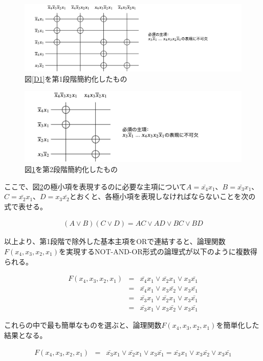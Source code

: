 \documentclass[10pt,dvipdfmx]{jsarticle}
\begin{document}
\begin{figure}
\begin{center}
\includegraphics[width=15cm]{D2.jpg}
\end{center}
\caption{図\ref{D1}を第1段階簡約化したもの}
\label{D2}
\end{figure}

\begin{figure}
\begin{center}
\includegraphics[width=12cm]{D3.jpg}
\end{center}
\caption{図\ref{D2}を第2段階簡約化したもの}
\label{D3}
\end{figure}

ここで、図\ref{D3}の極小項を表現するのに必要な主項について$A=\bar{x_4}x_1$、$B=\bar{x_3}x_1$、$C=\bar{x_2}x_1$、$D=x_3\bar{x_2}$とおくと、各極小項を表現しなければならないことを次の式で表せる。

\begin{eqnarray*}
(A \lor B)(C \lor D) = AC \lor AD \lor BC \lor BD
\end{eqnarray*}

以上より、第1段階で除外した基本主項をORで連結すると、論理関数$F(x_4, x_3, x_2, x_1)$を実現するNOT-AND-OR形式の論理式が以下のように複数得られる。

\begin{eqnarray*}
F(x_4, x_3, x_2, x_1) &=& \bar{x_4}x_1 \lor \bar{x_2}x_1 \lor x_3\bar{x_1} \\
&=& \bar{x_4}x_1 \lor x_3\bar{x_2} \lor x_3\bar{x_1} \\
&=& \bar{x_3}x_1 \lor \bar{x_2}x_1 \lor x_3\bar{x_1} \\
&=& \bar{x_3}x_1 \lor x_3\bar{x_2} \lor x_3\bar{x_1}
\end{eqnarray*}

これらの中で最も簡単なものを選ぶと、論理関数$F(x_4, x_3, x_2, x_1)$を簡単化した結果となる。

\begin{eqnarray*}
F(x_4, x_3, x_2, x_1) &=& \bar{x_3}x_1 \lor \bar{x_2}x_1 \lor x_3\bar{x_1} = \bar{x_3}x_1 \lor x_3\bar{x_2} \lor x_3\bar{x_1}
\end{eqnarray*}
\end{document}
